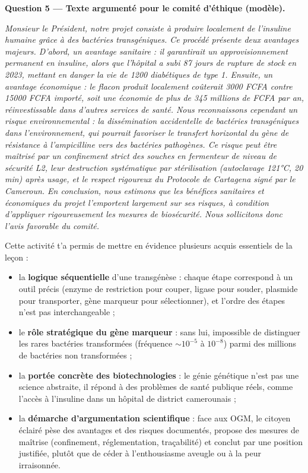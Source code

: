 \documentclass[11pt]{article}
\newcounter{popsec}
\newcounter{popsub}
\newcommand{\courssub}[1]{%
  \stepcounter{popsub}%
  \par\vspace{9pt}\noindent{\popxbold\fontsize{11.5}{13}\selectfont\color{popink}{\color{poporange}\thepopsec.\thepopsub}\hspace{6pt}#1}\par\nopagebreak\vspace{4pt}
}
\begin{document}
\begin{exoresolu}
\textbf{Question 5 — Texte argumenté pour le comité d'éthique (modèle).}

\emph{Monsieur le Président, notre projet consiste à produire localement de l'insuline humaine grâce à des bactéries transgéniques. Ce procédé présente deux avantages majeurs. D'abord, un avantage sanitaire : il garantirait un approvisionnement permanent en insuline, alors que l'hôpital a subi 87 jours de rupture de stock en 2023, mettant en danger la vie de 1200 diabétiques de type 1. Ensuite, un avantage économique : le flacon produit localement coûterait 3000 FCFA contre 15000 FCFA importé, soit une économie de plus de 345 millions de FCFA par an, réinvestissable dans d'autres services de santé. Nous reconnaissons cependant un risque environnemental : la dissémination accidentelle de bactéries transgéniques dans l'environnement, qui pourrait favoriser le transfert horizontal du gène de résistance à l'ampicilline vers des bactéries pathogènes. Ce risque peut être maîtrisé par un confinement strict des souches en fermenteur de niveau de sécurité L2, leur destruction systématique par stérilisation (autoclavage 121°C, 20 min) après usage, et le respect rigoureux du Protocole de Cartagena signé par le Cameroun. En conclusion, nous estimons que les bénéfices sanitaires et économiques du projet l'emportent largement sur ses risques, à condition d'appliquer rigoureusement les mesures de biosécurité. Nous sollicitons donc l'avis favorable du comité.}

\end{exoresolu}

\courssub{Bilan de l'activité}

Cette activité t'a permis de mettre en évidence plusieurs acquis essentiels de la leçon :
\begin{itemize}
\item la \textbf{logique séquentielle} d'une transgénèse : chaque étape correspond à un outil précis (enzyme de restriction pour couper, ligase pour souder, plasmide pour transporter, gène marqueur pour sélectionner), et l'ordre des étapes n'est pas interchangeable ;
\item le \textbf{rôle stratégique du gène marqueur} : sans lui, impossible de distinguer les rares bactéries transformées (fréquence $\sim 10^{-5}$ à $10^{-8}$) parmi des millions de bactéries non transformées ;
\item la \textbf{portée concrète des biotechnologies} : le génie génétique n'est pas une science abstraite, il répond à des problèmes de santé publique réels, comme l'accès à l'insuline dans un hôpital de district camerounais ;
\item la \textbf{démarche d'argumentation scientifique} : face aux OGM, le citoyen éclairé pèse des avantages et des risques documentés, propose des mesures de maîtrise (confinement, réglementation, traçabilité) et conclut par une position justifiée, plutôt que de céder à l'enthousiasme aveugle ou à la peur irraisonnée.
\end{itemize}
\end{document}

